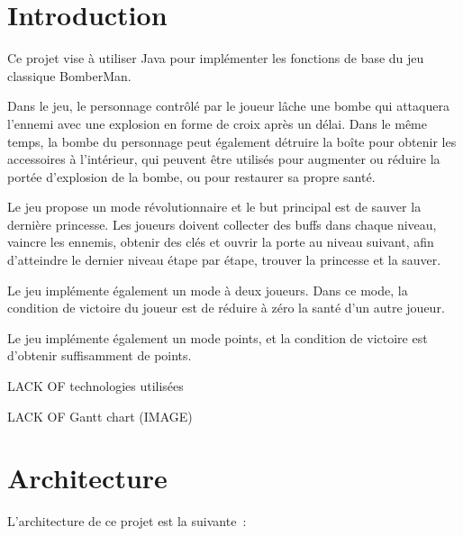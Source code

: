 \documentclass[11pt,english]{article}
\begin{document}
\pagebreak

\tableofcontents

\pagebreak

\large 

\section{Introduction}

\indent

Ce projet vise à utiliser Java pour implémenter les fonctions de base du jeu classique BomberMan.

\indent Dans le jeu, le personnage contrôlé par le joueur lâche une bombe qui attaquera l'ennemi avec une explosion en forme de croix après un délai. Dans le même temps, la bombe du personnage peut également détruire la boîte pour obtenir les accessoires à l'intérieur, qui peuvent être utilisés pour augmenter ou réduire la portée d'explosion de la bombe, ou pour restaurer sa propre santé.

\indent Le jeu propose un mode révolutionnaire et le but principal est de sauver la dernière princesse. Les joueurs doivent collecter des buffs dans chaque niveau, vaincre les ennemis, obtenir des clés et ouvrir la porte au niveau suivant, afin d'atteindre le dernier niveau étape par étape, trouver la princesse et la sauver.

\indent Le jeu implémente également un mode à deux joueurs. Dans ce mode, la condition de victoire du joueur est de réduire à zéro la santé d'un autre joueur.

\indent Le jeu implémente également un mode points, et la condition de victoire est d'obtenir suffisamment de points.

\indent LACK OF technologies utilisées

\indent LACK OF Gantt chart (IMAGE)


\section{Architecture}

\indent

L'architecture de ce projet est la suivante :
\end{document}
